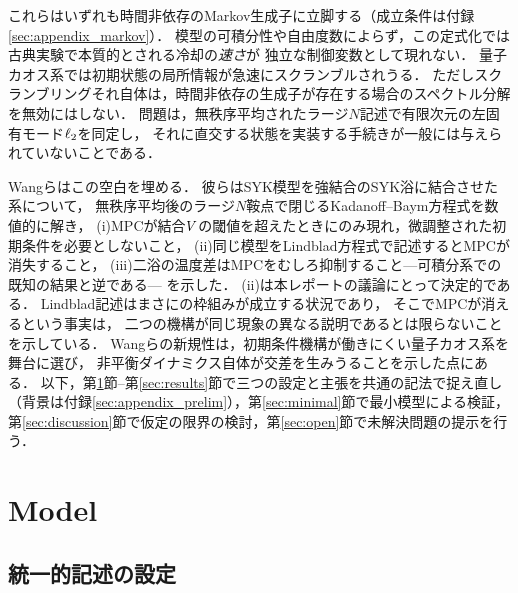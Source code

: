 \documentclass[a4paper,11pt,onecolumn,baselineskip=14.5pt]{jlreq}
\begin{document}
これらはいずれも時間非依存のMarkov生成子に立脚する（成立条件は付録\ref{sec:appendix_markov}）．
模型の可積分性や自由度数によらず，この定式化では古典実験で本質的とされる冷却の\emph{速さ}が
独立な制御変数として現れない．
量子カオス系では初期状態の局所情報が急速にスクランブルされうる\cite{Maldacena2016}．
ただしスクランブリングそれ自体は，時間非依存の生成子が存在する場合のスペクトル分解を無効にはしない．
問題は，無秩序平均されたラージ$N$記述で有限次元の左固有モード$\ell_{2}$を同定し，
それに直交する状態を実装する手続きが一般には与えられていないことである．

Wangら\cite{Wang2024}はこの空白を埋める．
彼らはSYK模型を強結合のSYK浴に結合させた系について，
無秩序平均後のラージ$N$鞍点で閉じるKadanoff--Baym方程式を数値的に解き，
(i)MPCが結合$V$の閾値を超えたときにのみ現れ，微調整された初期条件を必要としないこと，
(ii)同じ模型をLindblad方程式で記述するとMPCが消失すること，
(iii)二浴の温度差はMPCをむしろ抑制すること---可積分系での既知の結果\cite{WangWang2024}と逆である---
を示した．
(ii)は本レポートの議論にとって決定的である．
Lindblad記述はまさに\cite{Carollo2021}の枠組みが成立する状況であり，
そこでMPCが消えるという事実は，
二つの機構が同じ現象の異なる説明であるとは限らないことを示している．
Wangらの新規性は，初期条件機構が働きにくい量子カオス系を舞台に選び，
非平衡ダイナミクス自体が交差を生みうることを示した点にある．
以下，第\ref{sec:model}節--第\ref{sec:results}節で三つの設定と主張を共通の記法で捉え直し
（背景は付録\ref{sec:appendix_prelim}），第\ref{sec:minimal}節で最小模型による検証，
第\ref{sec:discussion}節で仮定の限界の検討，第\ref{sec:open}節で未解決問題の提示を行う．

\section{Model}
\label{sec:model}

\subsection{統一的記述の設定}
\label{sec:model_unified}
\end{document}
